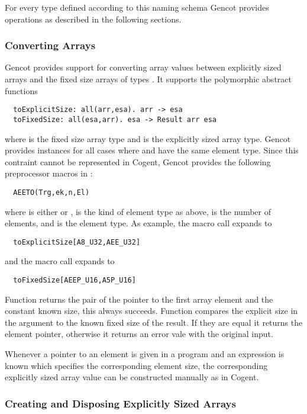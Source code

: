 For every type defined according to this naming schema Gencot provides operations as described in the following sections.

\subsubsection{Converting Arrays}

Gencot provides support for converting array values between explicitly sized arrays and the fixed size arrays of types
. It supports the polymorphic abstract functions
\begin{verbatim}
  toExplicitSize: all(arr,esa). arr -> esa
  toFixedSize: all(esa,arr). esa -> Result arr esa
\end{verbatim}
where  is the fixed size array type and  is the explicitly sized array type. Gencot provides instances
for all cases where  and  have the same element type. Since this contraint cannot be represented in
Cogent, Gencot provides the following preprocessor macros in :
\begin{verbatim}
  AEETO(Trg,ek,n,El)
\end{verbatim}
where  is either  or ,  is the kind of element type as above,  is the 
number of elements, and  is the element type. As example, the macro call  expands to
\begin{verbatim}
  toExplicitSize[A8_U32,AEE_U32]
\end{verbatim}
and the macro call  expands to
\begin{verbatim}
  toFixedSize[AEEP_U16,A5P_U16]
\end{verbatim}

Function  returns the pair of the pointer to the first array element and the constant known size, this
always succeeds. Function  compares the explicit size in the argument to the known fixed size of the result.
If they are equal it returns the element pointer, otherwise it returns an error vale with the original input.

Whenever a pointer  to an element is given in a program and an expression  is known which specifies the corresponding
element size, the corresponding explicitly sized array value can be constructed manually as  in Cogent.

\subsubsection{Creating and Disposing Explicitly Sized Arrays}

